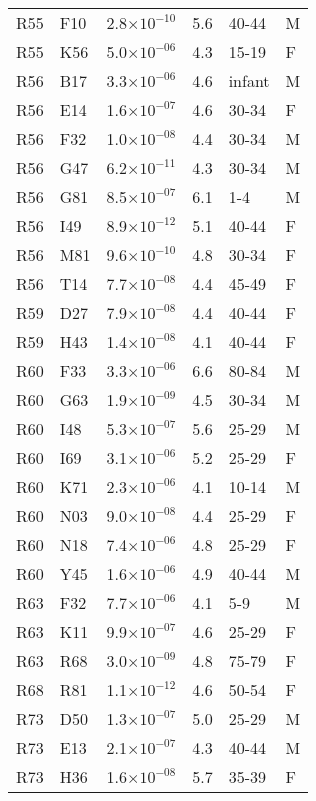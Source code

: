 \begin{longtable}{lllrll}
   R55 & F10 & 2.8$\times10^{-10}$ & 5.6 & 40-44 & M \\ 
   R55 & K56 & 5.0$\times10^{-06}$ & 4.3 & 15-19 & F \\ 
   R56 & B17 & 3.3$\times10^{-06}$ & 4.6 & infant & M \\ 
   R56 & E14 & 1.6$\times10^{-07}$ & 4.6 & 30-34 & F \\ 
   R56 & F32 & 1.0$\times10^{-08}$ & 4.4 & 30-34 & M \\ 
   R56 & G47 & 6.2$\times10^{-11}$ & 4.3 & 30-34 & M \\ 
   R56 & G81 & 8.5$\times10^{-07}$ & 6.1 & 1-4 & M \\ 
   R56 & I49 & 8.9$\times10^{-12}$ & 5.1 & 40-44 & F \\ 
   R56 & M81 & 9.6$\times10^{-10}$ & 4.8 & 30-34 & F \\ 
   R56 & T14 & 7.7$\times10^{-08}$ & 4.4 & 45-49 & F \\ 
   R59 & D27 & 7.9$\times10^{-08}$ & 4.4 & 40-44 & F \\ 
   R59 & H43 & 1.4$\times10^{-08}$ & 4.1 & 40-44 & F \\ 
   R60 & F33 & 3.3$\times10^{-06}$ & 6.6 & 80-84 & M \\ 
   R60 & G63 & 1.9$\times10^{-09}$ & 4.5 & 30-34 & M \\ 
   R60 & I48 & 5.3$\times10^{-07}$ & 5.6 & 25-29 & M \\ 
   R60 & I69 & 3.1$\times10^{-06}$ & 5.2 & 25-29 & F \\ 
   R60 & K71 & 2.3$\times10^{-06}$ & 4.1 & 10-14 & M \\ 
   R60 & N03 & 9.0$\times10^{-08}$ & 4.4 & 25-29 & F \\ 
   R60 & N18 & 7.4$\times10^{-06}$ & 4.8 & 25-29 & F \\ 
   R60 & Y45 & 1.6$\times10^{-06}$ & 4.9 & 40-44 & M \\ 
   R63 & F32 & 7.7$\times10^{-06}$ & 4.1 & 5-9 & M \\ 
   R63 & K11 & 9.9$\times10^{-07}$ & 4.6 & 25-29 & F \\ 
   R63 & R68 & 3.0$\times10^{-09}$ & 4.8 & 75-79 & F \\ 
   R68 & R81 & 1.1$\times10^{-12}$ & 4.6 & 50-54 & F \\ 
   R73 & D50 & 1.3$\times10^{-07}$ & 5.0 & 25-29 & M \\ 
   R73 & E13 & 2.1$\times10^{-07}$ & 4.3 & 40-44 & M \\ 
   R73 & H36 & 1.6$\times10^{-08}$ & 5.7 & 35-39 & F \\ 

\end{longtable}
